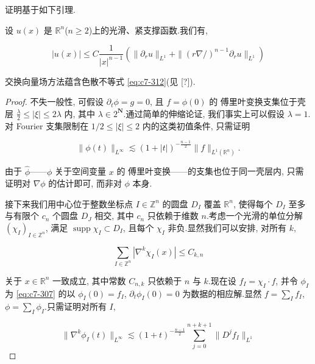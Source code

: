证明基于如下引理.

\begin{lemma}\label{lem:c7-0.29}
设 $u(x)$ 是 $\mathbb{R}^n$($n\geq 2$)上的光滑、紧支撑函数.我们有,

\begin{equation}
|u(x)| \leq C\frac{1}{|x|^{n-1}}\left(\|\partial_r u\|_{L^1} + \|(r\nabla\!\!\!/)^{n-1}\partial_r u\|_{L^1}\right)\label{eq:c7-323}
\end{equation}
\end{lemma}

\begin{proposition}[交换向量场方法]\label{prop:c7-0.30}
交换向量场方法蕴含色散不等式 \eqref{eq:c7-312}(见 [?]).
\end{proposition}

\begin{proof}
不失一般性, 可假设 $\partial_t\phi = g = 0$, 且 $f = \phi(0)$ 的 傅里叶变换支集位于壳层 $\frac{\lambda}{2}\leq|\xi|\leq 2\lambda$ 内, 其中 $\lambda\in 2^{\mathbf{N}}$.通过简单的伸缩论证, 我们事实上可以假设 $\lambda = 1$.对 Fourier 支集限制在 $1/2\leq|\xi|\leq 2$ 内的这类初值条件, 只需证明

\[
\|\phi(t)\|_{L^{\infty}} \lesssim (1+|t|)^{-\frac{n-1}{2}}\|f\|_{L^1(\mathbb{R}^n)}.
\]

由于 $\hat{\phi}$——$\phi$ 关于空间变量 $x$ 的 傅里叶变换——的支集也位于同一壳层内, 只需证明对 $\nabla\phi$ 的估计即可, 而非对 $\phi$ 本身.

接下来我们用中心位于整数坐标点 $I\in\mathbb{Z}^n$ 的圆盘 $D_I$ 覆盖 $\mathbb{R}^n$, 使得每个 $D_I$ 至多与有限个 $c_n$ 个圆盘 $D_J$ 相交, 其中 $c_n$ 只依赖于维数 $n$.考虑一个光滑的单位分解 $(\chi_I)_{I\in\mathbb{Z}^n}$, 满足 $\operatorname{supp}\chi_I\subset D_I$, 且每个 $\chi_I$ 非负.显然我们可以安排, 对所有 $k$,

\begin{equation}
\sum_{I\in\mathbb{Z}^n}|\nabla^k\chi_I(x)| \leq C_{k, n}\label{eq:c7-324}
\end{equation}

关于 $x\in\mathbb{R}^n$ 一致成立, 其中常数 $C_{n, k}$ 只依赖于 $n$ 与 $k$.现在设 $f_I = \chi_I\cdot f$, 并令 $\phi_I$ 为 \eqref{eq:c7-307} 的以 $\phi_I(0) = f_I$, $\partial_t\phi_I(0) = 0$ 为数据的相应解.显然 $f = \sum_I f_I$, $\phi = \sum_I\phi_I$.只需证明对所有 $I$,

\begin{equation}
\|\nabla^k\phi_I(t)\|_{L^{\infty}} \lesssim (1+t)^{-\frac{n-1}{2}}\sum_{j=0}^{n+k+1}\|D^j f_I\|_{L^1}\label{eq:c7-325}
\end{equation}


\end{proof}
